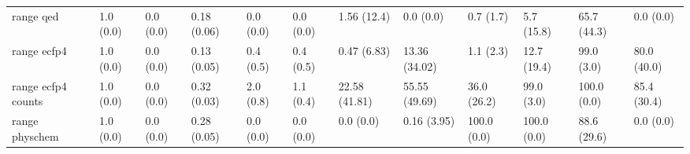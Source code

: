 \begin{tabular}{llllllllllll}
range qed & {\cellcolor[HTML]{F6FCFD}} \color[HTML]{000000} 1.0 (0.0) & {\cellcolor[HTML]{F7FCFD}} \color[HTML]{000000} 0.0 (0.0) & {\cellcolor[HTML]{DAF1F1}} \color[HTML]{000000} 0.18 (0.06) & {\cellcolor[HTML]{F7FCFD}} \color[HTML]{000000} 0.0 (0.0) & {\cellcolor[HTML]{F7FCFD}} \color[HTML]{000000} 0.0 (0.0) & {\cellcolor[HTML]{F5FBFC}} \color[HTML]{000000} 1.56 (12.4) & {\cellcolor[HTML]{F7FCFD}} \color[HTML]{000000} 0.0 (0.0) & {\cellcolor[HTML]{F6FCFD}} \color[HTML]{000000} 0.7 (1.7) & {\cellcolor[HTML]{EFF9FB}} \color[HTML]{000000} 5.7 (15.8) & {\cellcolor[HTML]{39A569}} \color[HTML]{F1F1F1} 65.7 (44.3) & {\cellcolor[HTML]{F7FCFD}} \color[HTML]{000000} 0.0 (0.0) \\
range ecfp4 & {\cellcolor[HTML]{F6FCFD}} \color[HTML]{000000} 1.0 (0.0) & {\cellcolor[HTML]{F7FCFD}} \color[HTML]{000000} 0.0 (0.0) & {\cellcolor[HTML]{E5F5F9}} \color[HTML]{000000} 0.13 (0.05) & {\cellcolor[HTML]{F6FCFD}} \color[HTML]{000000} 0.4 (0.5) & {\cellcolor[HTML]{F6FCFD}} \color[HTML]{000000} 0.4 (0.5) & {\cellcolor[HTML]{F6FCFD}} \color[HTML]{000000} 0.47 (6.83) & {\cellcolor[HTML]{E3F4F8}} \color[HTML]{000000} 13.36 (34.02) & {\cellcolor[HTML]{F6FCFD}} \color[HTML]{000000} 1.1 (2.3) & {\cellcolor[HTML]{E5F5F9}} \color[HTML]{000000} 12.7 (19.4) & {\cellcolor[HTML]{00471C}} \color[HTML]{F1F1F1} 99.0 (3.0) & {\cellcolor[HTML]{157F3B}} \color[HTML]{F1F1F1} 80.0 (40.0) \\
range ecfp4 counts & {\cellcolor[HTML]{F6FCFD}} \color[HTML]{000000} 1.0 (0.0) & {\cellcolor[HTML]{F7FCFD}} \color[HTML]{000000} 0.0 (0.0) & {\cellcolor[HTML]{B0E1D6}} \color[HTML]{000000} 0.32 (0.03) & {\cellcolor[HTML]{F4FBFC}} \color[HTML]{000000} 2.0 (0.8) & {\cellcolor[HTML]{F6FCFD}} \color[HTML]{000000} 1.1 (0.4) & {\cellcolor[HTML]{D1EEEA}} \color[HTML]{000000} 22.58 (41.81) & {\cellcolor[HTML]{55B98F}} \color[HTML]{F1F1F1} 55.55 (49.69) & {\cellcolor[HTML]{9FDACC}} \color[HTML]{000000} 36.0 (26.2) & {\cellcolor[HTML]{00471C}} \color[HTML]{F1F1F1} 99.0 (3.0) & {\cellcolor[HTML]{00441B}} \color[HTML]{F1F1F1} 100.0 (0.0) & {\cellcolor[HTML]{067230}} \color[HTML]{F1F1F1} 85.4 (30.4) \\
range physchem & {\cellcolor[HTML]{F6FCFD}} \color[HTML]{000000} 1.0 (0.0) & {\cellcolor[HTML]{F7FCFD}} \color[HTML]{000000} 0.0 (0.0) & {\cellcolor[HTML]{C2E8E0}} \color[HTML]{000000} 0.28 (0.05) & {\cellcolor[HTML]{F7FCFD}} \color[HTML]{000000} 0.0 (0.0) & {\cellcolor[HTML]{F7FCFD}} \color[HTML]{000000} 0.0 (0.0) & {\cellcolor[HTML]{F7FCFD}} \color[HTML]{000000} 0.0 (0.0) & {\cellcolor[HTML]{F7FCFD}} \color[HTML]{000000} 0.16 (3.95) & {\cellcolor[HTML]{00441B}} \color[HTML]{F1F1F1} 100.0 (0.0) & {\cellcolor[HTML]{00441B}} \color[HTML]{F1F1F1} 100.0 (0.0) & {\cellcolor[HTML]{00692A}} \color[HTML]{F1F1F1} 88.6 (29.6) & {\cellcolor[HTML]{F7FCFD}} \color[HTML]{000000} 0.0 (0.0) \\

\end{tabular}
